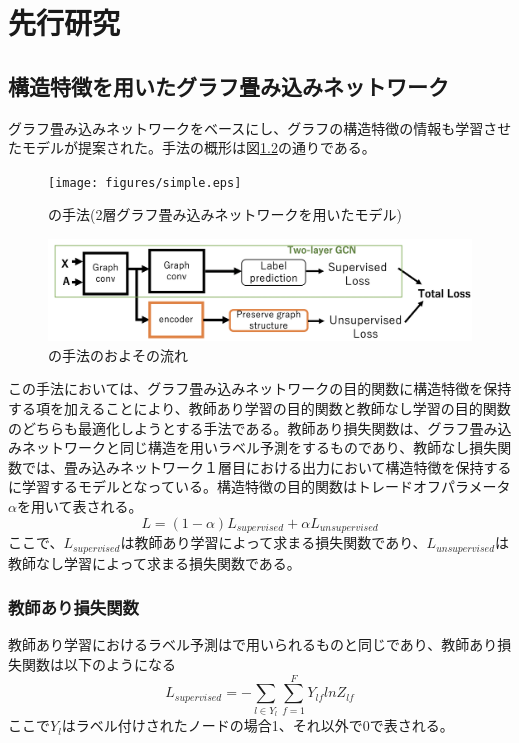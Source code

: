 \chapter{先行研究}
\section{構造特徴を用いたグラフ畳み込みネットワーク}
グラフ畳み込みネットワーク\cite{gcn}をベースにし、グラフの構造特徴の情報も学習させたモデルが提案された\cite{GCN_SS}。手法の概形は図\ref{fig:architecture}の通りである。

\begin{figure}[htbp]
  \centering
  \texttt{[image: figures/simple.eps]}
  \caption{\cite{GCN_SS}の手法(2層グラフ畳み込みネットワークを用いたモデル)}
  \label{fig:architecture}
\end{figure}

\newpage{}


\begin{figure}[htbp]
  \centering
  \includegraphics[width=1.0\hsize]{figures/GCN_SS.pdf}
  \caption{\cite{GCN_SS}の手法のおよその流れ}
  \label{fig:architecture}
\end{figure}


この手法においては、グラフ畳み込みネットワークの目的関数に構造特徴を保持する項を加えることにより、教師あり学習の目的関数と教師なし学習の目的関数のどちらも最適化しようとする手法である。教師あり損失関数は、グラフ畳み込みネットワークと同じ構造を用いラベル予測をするものであり、教師なし損失関数では、畳み込みネットワーク１層目における出力において構造特徴を保持するに学習するモデルとなっている。構造特徴の目的関数はトレードオフパラメータ$\alpha$を用いて表される。
\begin{equation}
L = (1-\alpha) L_{supervised} + \alpha L_{unsupervised}
\end{equation}
ここで、$L_{supervised}$は教師あり学習によって求まる損失関数であり、$L_{unsupervised}$は教師なし学習によって求まる損失関数である。

\subsection{教師あり損失関数}
教師あり学習におけるラベル予測は\cite{gcn}で用いられるものと同じであり、教師あり損失関数は以下のようになる
\begin{equation}
L_{supervised} = - \sum_{l \in Y_{l}} \sum_{f=1}^{F} Y_{lf} lnZ_{lf}
\end{equation}
ここで$Y_{l}$はラベル付けされたノードの場合1、それ以外で0で表される。

